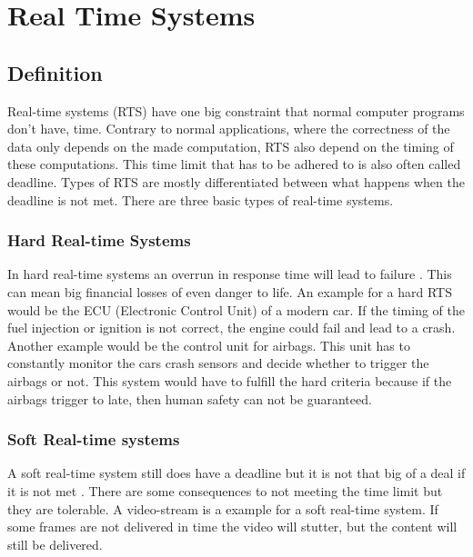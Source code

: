 \chapter{Real Time Systems}
\label{ch:realtimesystems}

\author{Nico Kratky}
%
\section{Definition}

Real-time systems (RTS) have one big constraint that normal computer programs don't have, time. Contrary to normal applications, where the correctness of the data only depends on the made computation, RTS also depend on the timing of these computations. This time limit that has to be adhered to is also often called deadline.
Types of RTS are mostly differentiated between what happens when the deadline is not met. There are three basic types of real-time systems.

\subsection{Hard Real-time Systems}

In hard real-time systems an overrun in response time will lead to failure \autocite{RealTimeHermannKopetz}. This can mean big financial losses of even danger to life. An example for a hard RTS would be the ECU (Electronic Control Unit) of a modern car. If the timing of the fuel injection or ignition is not correct, the engine could fail and lead to a crash. Another example would be the control unit for airbags. This unit has to constantly monitor the cars crash sensors and decide whether to trigger the airbags or not. This system would have to fulfill the hard criteria because if the airbags trigger to late, then human safety can not be guaranteed.

\subsection{Soft Real-time systems}

A soft real-time system still does have a deadline but it is not that big of a deal if it is not met \autocite{RealTimeHermannKopetz}. There are some consequences to not meeting the time limit but they are tolerable. A video-stream is a example for a soft real-time system. If some frames are not delivered in time the video will stutter, but the content will still be delivered.

